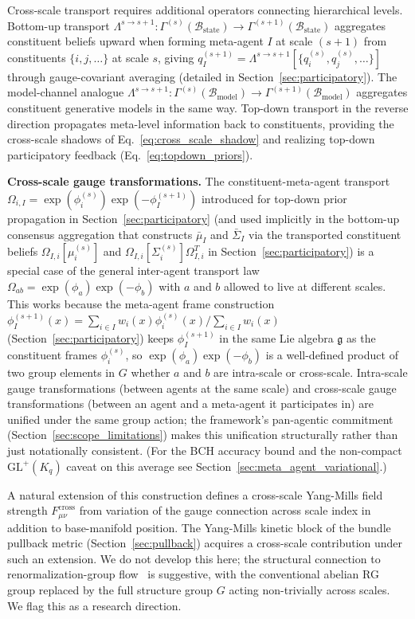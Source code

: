 \documentclass[11pt]{article}
\begin{document}
Cross-scale transport requires additional operators connecting hierarchical levels. Bottom-up transport $\Lambda^{s \to s+1}: \Gamma^{(s)}(\mathcal{B}_{\mathrm{state}}) \to \Gamma^{(s+1)}(\mathcal{B}_{\mathrm{state}})$ aggregates constituent beliefs upward when forming meta-agent $I$ at scale $(s+1)$ from constituents $\{i,j,\ldots\}$ at scale $s$, giving $q_I^{(s+1)} = \Lambda^{s \to s+1}[\{q_i^{(s)}, q_j^{(s)}, \ldots\}]$ through gauge-covariant averaging (detailed in Section~\ref{sec:participatory}). The model-channel analogue $\Lambda^{s \to s+1}: \Gamma^{(s)}(\mathcal{B}_{\mathrm{model}}) \to \Gamma^{(s+1)}(\mathcal{B}_{\mathrm{model}})$ aggregates constituent generative models in the same way. Top-down transport in the reverse direction propagates meta-level information back to constituents, providing the cross-scale shadows of Eq.~\eqref{eq:cross_scale_shadow} and realizing top-down participatory feedback (Eq.~\eqref{eq:topdown_priors}).

\textbf{Cross-scale gauge transformations.} The constituent-meta-agent transport $\Omega_{i,I} = \exp(\phi_i^{(s)})\exp(-\phi_I^{(s+1)})$ introduced for top-down prior propagation in Section~\ref{sec:participatory} (and used implicitly in the bottom-up consensus aggregation that constructs $\bar{\mu}_I$ and $\bar{\Sigma}_I$ via the transported constituent beliefs $\Omega_{I,i}[\mu_i^{(s)}]$ and $\Omega_{I,i}[\Sigma_i^{(s)}]\Omega_{I,i}^T$ in Section~\ref{sec:participatory}) is a special case of the general inter-agent transport law $\Omega_{ab} = \exp(\phi_a)\exp(-\phi_b)$ with $a$ and $b$ allowed to live at different scales. This works because the meta-agent frame construction $\phi_I^{(s+1)}(x) = \sum_{i \in I} w_i(x) \phi_i^{(s)}(x) / \sum_{i \in I} w_i(x)$ (Section~\ref{sec:participatory}) keeps $\phi_I^{(s+1)}$ in the same Lie algebra $\mathfrak{g}$ as the constituent frames $\phi_i^{(s)}$, so $\exp(\phi_a)\exp(-\phi_b)$ is a well-defined product of two group elements in $G$ whether $a$ and $b$ are intra-scale or cross-scale. Intra-scale gauge transformations (between agents at the same scale) and cross-scale gauge transformations (between an agent and a meta-agent it participates in) are unified under the same group action; the framework's pan-agentic commitment (Section~\ref{sec:scope_limitations}) makes this unification structurally rather than just notationally consistent. (For the BCH accuracy bound and the non-compact $\mathrm{GL}^+(K_q)$ caveat on this average see Section~\ref{sec:meta_agent_variational}.)

A natural extension of this construction defines a cross-scale Yang-Mills field strength $F^{\mathrm{cross}}_{\mu\nu}$ from variation of the gauge connection across scale index in addition to base-manifold position. The Yang-Mills kinetic block of the bundle pullback metric (Section~\ref{sec:pullback}) acquires a cross-scale contribution under such an extension. We do not develop this here; the structural connection to renormalization-group flow~\cite{Wilson1971, Cardy1996} is suggestive, with the conventional abelian RG group replaced by the full structure group $G$ acting non-trivially across scales. We flag this as a research direction.
\end{document}
